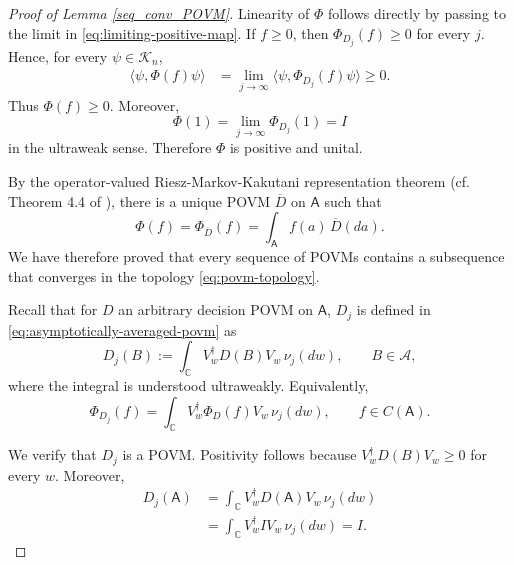 \documentclass{article}
\theoremstyle{named}
\theoremstyle{named1}
\newcommand{\bbC}{\mathbb C}
\theoremstyle{plain}
\theoremstyle{remark}
\begin{document}
\begin{proof}[Proof of Lemma \ref{seq_conv_POVM}]
Linearity of \(\Phi\) follows directly by passing to the limit in
\eqref{eq:limiting-positive-map}. If \(f\geq0\), then
$\Phi_{D_j}(f)\geq0$ for every \(j\). Hence, for every \(\psi\in\mathcal K_n\),
\begin{align}
    \langle\psi,\Phi(f)\psi\rangle
    &=
    \lim_{j\to\infty}
    \langle\psi,\Phi_{D_j}(f)\psi\rangle
    \geq0.
    \label{eq:positivity-of-limit-map}
\end{align}
Thus \(\Phi(f)\geq0\). Moreover,
\begin{equation}
    \Phi(1)
    =
    \lim_{j\to\infty}\Phi_{D_j}(1)
    =
    I
    \label{eq:unitality-of-limit-map}
\end{equation}
in the ultraweak sense. Therefore \(\Phi\) is positive and unital.

By the operator-valued Riesz-Markov-Kakutani representation theorem (cf. Theorem 4.4 of \cite{Quantum_Measurements_2016}), there is a unique POVM
\(\overline D\) on \(\mathsf A\) such that
\begin{equation}
    \Phi(f)
    =
    \Phi_{\overline D}(f)
    =
    \int_{\mathsf A}f(a)\,\overline D(da).
    \label{eq:limiting-povm}
\end{equation}
We have therefore proved that every sequence of POVMs contains a subsequence
that converges in the topology \eqref{eq:povm-topology}.


Recall that for \(D\) an arbitrary decision POVM on \(\mathsf A\), $D_j$ is defined in \eqref{eq:asymptotically-averaged-povm} as
\begin{equation}
    D_j(B)
    :=
    \int_{\bbC}
        V_w^\dagger D(B)V_w\,
        \nu_j(dw),
    \qquad
    B\in\mathcal A,
\end{equation}
where the integral is understood ultraweakly. Equivalently,
\begin{equation}
    \Phi_{D_j}(f)
    =
    \int_{\bbC}
        V_w^\dagger\Phi_D(f)V_w\,
        \nu_j(dw),
    \qquad
    f\in C(\mathsf A).
    \label{eq:asymptotically-averaged-positive-map}
\end{equation}

We verify that \(D_j\) is a POVM. Positivity follows because
$V_w^\dagger D(B)V_w\geq0$
for every \(w\). Moreover,
\begin{align}
    D_j(\mathsf A)
    &=
    \int_{\bbC}
        V_w^\dagger D(\mathsf A)V_w\,
        \nu_j(dw)
    \nonumber\\
    &=
    \int_{\bbC}
        V_w^\dagger IV_w\,
        \nu_j(dw)
    =
    I.
    \label{eq:averaged-povm-normalization}
\end{align}


\end{proof}
\end{document}
